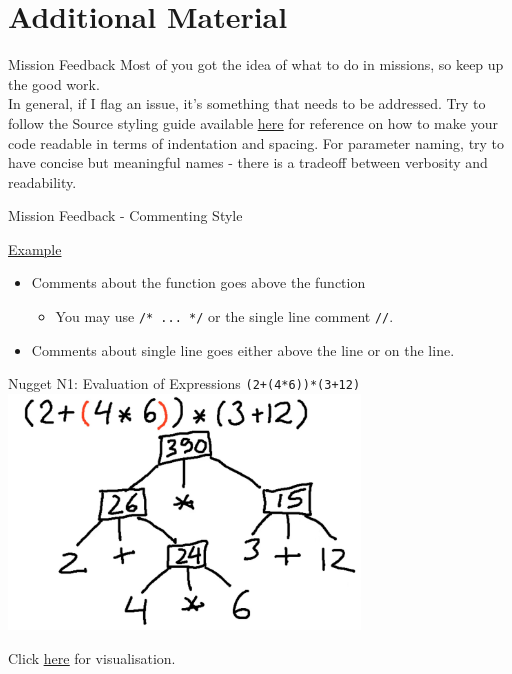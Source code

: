 \documentclass[10pt]{beamer}
\begin{document}
\section[Additional Material]{Additional Material}
\begin{frame}[fragile]{Mission Feedback}
Most of you got the idea of what to do in missions, so keep up the good work. \\

In general, if I flag an issue, it's something that needs to be addressed. Try to follow the Source styling guide available \href{https://source-academy.github.io/source/source_styleguide.pdf}{\underline{here}} for reference on how to make your code readable in terms of indentation and spacing. For parameter naming, try to have concise but meaningful names - there is a tradeoff between verbosity and readability.
\end{frame}

\begin{frame}[fragile]{Mission Feedback - Commenting Style}
\begin{centering}
  \href{https://share.sourceacademy.nus.edu.sg/8h}{Example}
\end{centering}
\begin{itemize}
  \item Comments about the function goes above the function
  \begin{itemize}
    \item You may use \verb|/* ... */| or the single line comment \verb|//|.
  \end{itemize}
  \item Comments about single line goes either above the line or on the line.
\end{itemize}   
\end{frame}

\begin{frame}[fragile]{Nugget N1: Evaluation of Expressions}
\texttt{(2+(4*6))*(3+12)} \\
\includegraphics[width=0.7\textwidth]{tree.png}

Click \href{https://youtu.be/X7v8MGhn_cc}{\underline{here}} for visualisation.
\end{frame}
\end{document}
